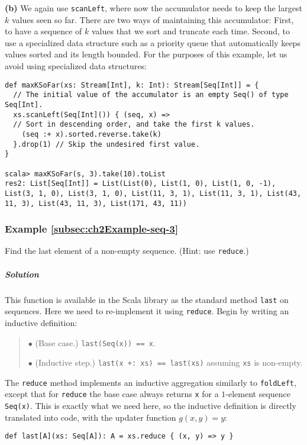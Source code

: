 \textbf{(b)} We again use \lstinline!scanLeft!, where now the accumulator
needs to keep the largest $k$ values seen so far. There are two ways
of maintaining this accumulator: First, to have a sequence of $k$
values that we sort and truncate each time. Second, to use a specialized
data structure such as a priority queue that automatically keeps values
sorted and its length bounded. For the purposes of this example, let
us avoid using specialized data structures:
\begin{lstlisting}
def maxKSoFar(xs: Stream[Int], k: Int): Stream[Seq[Int]] = {
  // The initial value of the accumulator is an empty Seq() of type Seq[Int].
  xs.scanLeft(Seq[Int]()) { (seq, x) =>
  // Sort in descending order, and take the first k values.
    (seq :+ x).sorted.reverse.take(k)
  }.drop(1) // Skip the undesired first value.
}

scala> maxKSoFar(s, 3).take(10).toList
res2: List[Seq[Int]] = List(List(0), List(1, 0), List(1, 0, -1), List(3, 1, 0), List(3, 1, 0), List(11, 3, 1), List(11, 3, 1), List(43, 11, 3), List(43, 11, 3), List(171, 43, 11)) 
\end{lstlisting}


\subsubsection{Example \label{subsec:ch2Example-seq-3}\ref{subsec:ch2Example-seq-3}}

Find the last element of a non-empty sequence. (Hint: use \lstinline!reduce!.)

\subparagraph{Solution}

This function is available in the Scala library as the standard method
\lstinline!last! on sequences. Here we need to re-implement it using
\lstinline!reduce!. Begin by writing an inductive definition:
\begin{quotation}
$\bullet$ (Base case.) \lstinline!last(Seq(x)) == x!.

$\bullet$ (Inductive step.) \lstinline!last(x +: xs) == last(xs)!
assuming \lstinline!xs! is non-empty.
\end{quotation}
The \lstinline!reduce! method implements an inductive aggregation
similarly to \lstinline!foldLeft!, except that for \lstinline!reduce!
the base case  always returns \lstinline!x! for a $1$-element sequence
\lstinline!Seq(x)!. This is exactly what we need here, so the inductive
definition is directly translated into code, with the updater function
$g(x,y)=y$:
\begin{lstlisting}
def last[A](xs: Seq[A]): A = xs.reduce { (x, y) => y }
\end{lstlisting}


